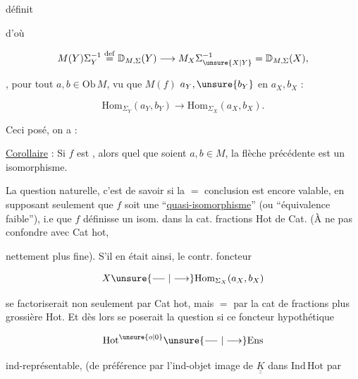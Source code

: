 définit


d'où

\[
 M(Y)\Sigma_Y^{-1}\overset{\mathrm{def}}{=}\mathbb D_{M,\Sigma}(Y)
 \longrightarrow M_X\Sigma_{\unsure{X|Y}}^{-1}=\mathbb D_{M,\Sigma}(X),
\]

, pour tout $a,b\in\mathrm{Ob}\,M$, vu que $M(f)$   $a_Y,\unsure{b_Y}$ en $a_X,b_X$ :

\[
 \boxed{\mathrm{Hom}_{\Sigma_Y}(a_Y,b_Y)\longrightarrow\mathrm{Hom}_{\Sigma_X}(a_X,b_X)}.
\]

Ceci posé, on a :

\uline{Corollaire} : Si $f$ est   , alors quel que soient $a,b\in M$, la flèche précédente est un isomorphisme.

La question naturelle, c'est de savoir si la $=$  conclusion est encore valable, en supposant seulement que $f$ soit une ``\uline{quasi-isomorphisme}'' (ou ``équivalence faible''), i.e que $f$ définisse un isom. dans la cat.  fractions Hot de Cat. (À ne pas confondre avec Cat hot,


nettement plus fine). S'il en était ainsi, le contr. foncteur

\[
 X\unsure{\relbar\joinrel\relbar|\longrightarrow}\mathrm{Hom}_{\Sigma_X}(a_X,b_X)
\]

se factoriserait non seulement par Cat hot, mais $=$ par la cat de fractions plus grossière Hot. Et dès lors se poserait la question si  ce  foncteur hypothétique

\[
 \mathrm{Hot}^{\unsure{o|0}}\unsure{\relbar\joinrel\relbar|\longrightarrow}\mathrm{Ens}
\]

 ind-représentable,  (de préférence par l'ind-objet image de $\underline{\underline K}$ dans $\mathrm{Ind\,Hot}$ par


